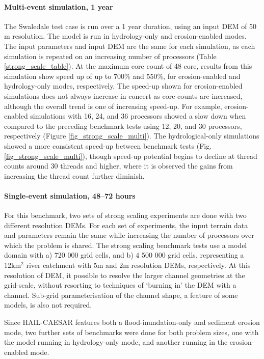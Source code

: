 \paragraph*{Multi-event simulation, 1 year}
The Swaledale test case is run over a 1 year duration, using an input DEM of 50 m resolution. The model is run in hydrology-only and erosion-enabled modes. The input parameters and input DEM are the same for each simulation, as each simulation is repeated on an increasing number of processors (Table \ref{strong_scale_table}). At the maximum core count of 48 core, results from this simulation show speed up of up to 700\% and 550\%, for erosion-enabled and hydrology-only modes, respectively. The speed-up shown for erosion-enabled simulations does not always increase in concert as core-counts are increased, although the overall trend is one of increasing speed-up. For example, erosion-enabled simulations with 16, 24, and 36 processors showed a slow down when compared to the preceding benchmark tests using 12, 20, and 30 processors, respectively (Figure \ref{fig_strong_scale_multi}). The hydrological-only simulations showed a more consistent speed-up between benchmark tests (Fig. \ref{fig_strong_scale_multi}), though speed-up potential begins to decline at thread counts around 30 threads and higher, where it is observed the gains from increasing the thread count further diminish.

\paragraph*{Single-event simulation, 48--72 hours}

For this benchmark, two sets of strong scaling experiments are done with two different resolution DEMs. For each set of experiments, the input terrain data and parameters remain the same while increasing the number of processors over which the problem is shared. The strong scaling benchmark tests use a model domain with a) 720 000 grid cells, and b) 4 500 000 grid cells, representing a 12km$^2$ river catchment with 5m and 2m resolution DEMs, respectively. At this resolution of DEM, it possible to resolve the larger channel geometries at the grid-scale, without resorting to techniques of `burning in' the DEM with a channel. Sub-grid parameterisation of the channel shape, a feature of some models, is also not required.

Since HAIL-CAESAR features both a flood-inundation-only and sediment erosion mode, two further sets of benchmarks were done for both problem sizes, one with the model running in hydrology-only mode, and another running in the erosion-enabled mode.

